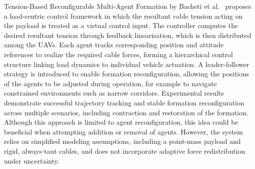 Tension-Based Reconfigurable Multi-Agent Formation by Bacheti et al.\ \cite{tensionbased} proposes a load-centric control framework in which the resultant cable tension acting on the payload is treated as a virtual control input. The controller computes the desired resultant tension through feedback linearisation, which is then distributed among the UAVs. Each agent tracks corresponding position and attitude references to realize the required cable forces, forming a hierarchical control structure linking load dynamics to individual vehicle actuation. A leader-follower strategy is introduced to enable formation reconfiguration, allowing the positions of the agents to be adjusted during operation, for example to navigate constrained environments such as narrow corridors. Experimental results demonstrate successful trajectory tracking and stable formation reconfiguration across multiple scenarios, including contraction and restoration of the formation. Although this approach is limited to agent reconfiguration, this idea could be beneficial when attempting addition or removal of agents. However, the system relies on simplified modeling assumptions, including a point-mass payload and rigid, always-taut cables, and does not incorporate adaptive force redistribution under uncertainty.
